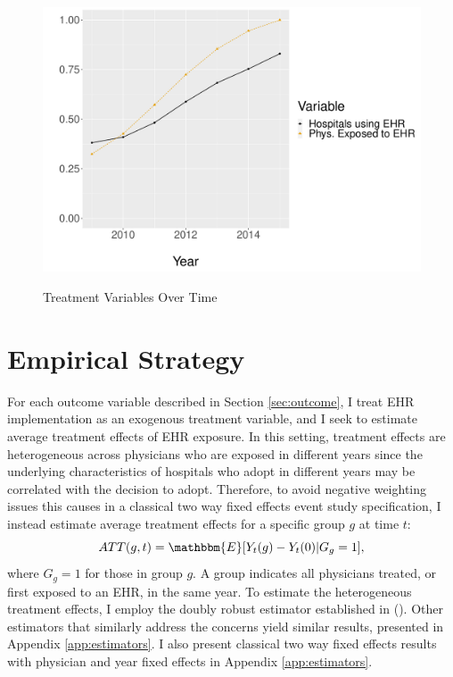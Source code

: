 \documentclass[12pt]{article}
\begin{document}
\begin{figure}[t]
\centering
\captionsetup{width=.45\linewidth}
    \caption{Treatment Variables Over Time}
    \includegraphics[scale=.5]{Objects/sum_stats_year.pdf}
    \label{fig:treatmentgraph}
\end{figure}



\section{Empirical Strategy}\label{sec:empstrat}

For each outcome variable described in Section \ref{sec:outcome}, I treat EHR implementation as an exogenous treatment variable, and I seek to estimate average treatment effects of EHR exposure. In this setting, treatment effects are heterogeneous across physicians who are exposed in different years since the underlying characteristics of hospitals who adopt in different years may be correlated with the decision to adopt. Therefore, to avoid negative weighting issues this causes in a classical two way fixed effects event study specification, I instead estimate average treatment effects for a specific group $g$ at time $t$: 
$$ATT(g,t)=\mathbbm{E}[Y_t(g)-Y_t(0)|G_g=1],$$
where $G_g=1$ for those in group $g$. A group indicates all physicians treated, or first exposed to an EHR, in the same year. To estimate the heterogeneous treatment effects, I employ the doubly robust estimator established in \citeauthor{sant2020doubly} (\citeyear{sant2020doubly}). Other estimators that similarly address the concerns yield similar results, presented in Appendix \ref{app:estimators}. I also present classical two way fixed effects results with physician and year fixed effects in Appendix \ref{app:estimators}.
\end{document}
